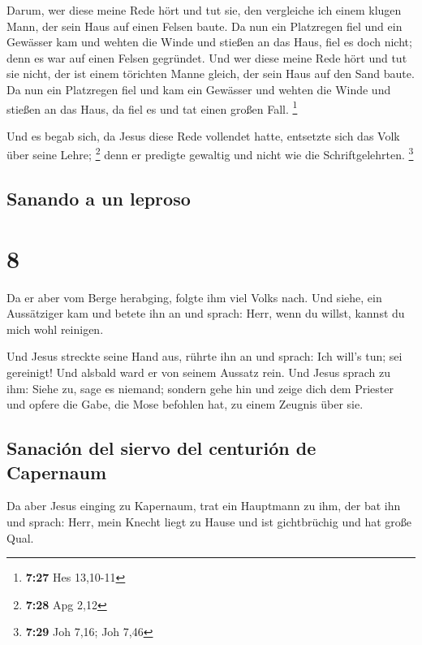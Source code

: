  Darum, wer diese meine Rede hört und tut sie, den
vergleiche ich einem klugen Mann, der sein Haus auf einen Felsen baute.
 Da nun ein Platzregen fiel und ein Gewässer kam und
wehten die Winde und stießen an das Haus, fiel es doch nicht; denn es
war auf einen Felsen gegründet.  Und wer diese meine Rede
hört und tut sie nicht, der ist einem törichten Manne gleich, der sein
Haus auf den Sand baute.  Da nun ein Platzregen fiel und
kam ein Gewässer und wehten die Winde und stießen an das Haus, da fiel
es und tat einen großen Fall. \footnote{\textbf{7:27} Hes 13,10-11}

 Und es begab sich, da Jesus diese Rede vollendet hatte,
entsetzte sich das Volk über seine Lehre; \footnote{\textbf{7:28} Apg
  2,12}  denn er predigte gewaltig und nicht wie die
Schriftgelehrten. \footnote{\textbf{7:29} Joh 7,16; Joh 7,46}

\hypertarget{sanando-a-un-leproso}{%
\subsection{Sanando a un leproso}\label{sanando-a-un-leproso}}

\hypertarget{section-7}{%
\section{8}\label{section-7}}

 Da er aber vom Berge herabging, folgte ihm viel Volks
nach.  Und siehe, ein Aussätziger kam und betete ihn an
und sprach: Herr, wenn du willst, kannst du mich wohl reinigen.

 Und Jesus streckte seine Hand aus, rührte ihn an und
sprach: Ich will's tun; sei gereinigt! Und alsbald ward er von seinem
Aussatz rein.  Und Jesus sprach zu ihm: Siehe zu, sage es
niemand; sondern gehe hin und zeige dich dem Priester und opfere die
Gabe, die Mose befohlen hat, zu einem Zeugnis über sie.

\hypertarget{sanaciuxf3n-del-siervo-del-centuriuxf3n-de-capernaum}{%
\subsection{Sanación del siervo del centurión de
Capernaum}\label{sanaciuxf3n-del-siervo-del-centuriuxf3n-de-capernaum}}

 Da aber Jesus einging zu Kapernaum, trat ein Hauptmann zu
ihm, der bat ihn  und sprach: Herr, mein Knecht liegt zu
Hause und ist gichtbrüchig und hat große Qual.

